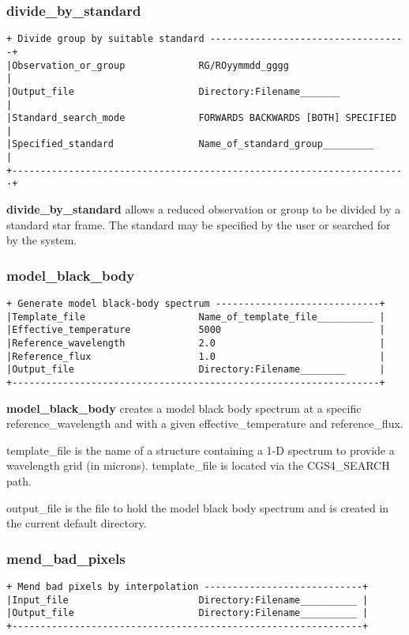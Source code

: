 {\subsubsection{divide\_by\_standard}
\label{divide_by_standard}
\begin{verbatim}
+ Divide group by suitable standard -----------------------------------+
|Observation_or_group             RG/ROyymmdd_gggg                     |
|Output_file                      Directory:Filename_______            |
|Standard_search_mode             FORWARDS BACKWARDS [BOTH] SPECIFIED  |
|Specified_standard               Name_of_standard_group_________      |
+----------------------------------------------------------------------+
\end{verbatim}

{\bf divide\_by\_standard} allows a reduced observation or group to be divided
by a standard star frame. The standard may be specified by the user or searched 
for by the system. 

\subsubsection{model\_black\_body}
\begin{verbatim}
+ Generate model black-body spectrum -----------------------------+
|Template_file                    Name_of_template_file__________ |
|Effective_temperature            5000                            |
|Reference_wavelength             2.0                             |
|Reference_flux                   1.0                             |
|Output_file                      Directory:Filename________      |
+-----------------------------------------------------------------+
\end{verbatim}

{\bf model\_black\_body} creates a model black body spectrum at a
specific {\sf reference\_wavelength} and with a given 
{\sf effective\_temperature} and {\sf reference\_flux}.

{\sf template\_file} is the name of a structure containing a 1-D spectrum
to provide a wavelength grid (in microns). {\sf template\_file} is located
via the CGS4\_SEARCH path.

{\sf output\_file} is the file to hold the model black body spectrum and is
created in the current default directory.

\subsubsection{mend\_bad\_pixels}
\begin{verbatim}
+ Mend bad pixels by interpolation ----------------------------+
|Input_file                       Directory:Filename__________ |
|Output_file                      Directory:Filename__________ |
+--------------------------------------------------------------+
\end{verbatim}

}
